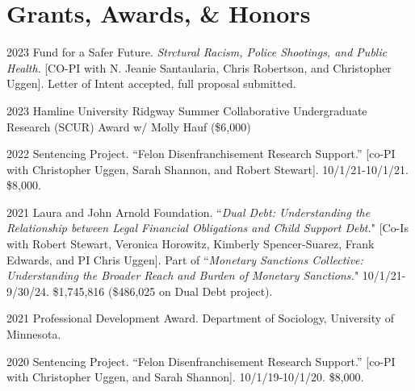 \documentclass[letterpaper]{article}
\renewenvironment{itemize}{
  \begin{list}{}{
    \setlength{\leftmargin}{1.5em}
  }
}{
  \end{list}
}
\begin{document}
\section*{\textbf{Grants, Awards, \& Honors}}

\begin{itemize}

\item 2023 Fund for a Safer Future. \textit{Strctural Racism, Police Shootings, and Public Health}. [CO-PI with N. Jeanie Santaularia, Chris Robertson, and Christopher Uggen]. Letter of Intent accepted, full proposal submitted. 

\item 2023 Hamline University Ridgway Summer Collaborative Undergraduate Research (SCUR) Award w/ Molly Hauf (\$6,000)
\item 2022 Sentencing Project. “Felon Disenfranchisement Research Support.” [co-PI with Christopher Uggen, Sarah Shannon, and Robert Stewart]. 10/1/21-10/1/21. \$8,000.
\item 2021  Laura and John Arnold Foundation. ``\textit{Dual Debt: Understanding the Relationship between Legal Financial Obligations and Child Support Debt.}" [Co-Is with Robert Stewart, Veronica Horowitz, Kimberly Spencer-Suarez, Frank Edwards, and PI Chris Uggen]. Part of ``\textit{Monetary Sanctions Collective: Understanding the Broader Reach and Burden of Monetary Sanctions.}" 10/1/21-9/30/24. \$1,745,816 (\$486,025 on Dual Debt project).
\item 2021 Professional Development Award. Department of Sociology, University of Minnesota. 
\item 2020 Sentencing Project. “Felon Disenfranchisement Research Support.” [co-PI with Christopher Uggen, and Sarah Shannon]. 10/1/19-10/1/20. \$8,000.


\end{itemize}
\end{document}
